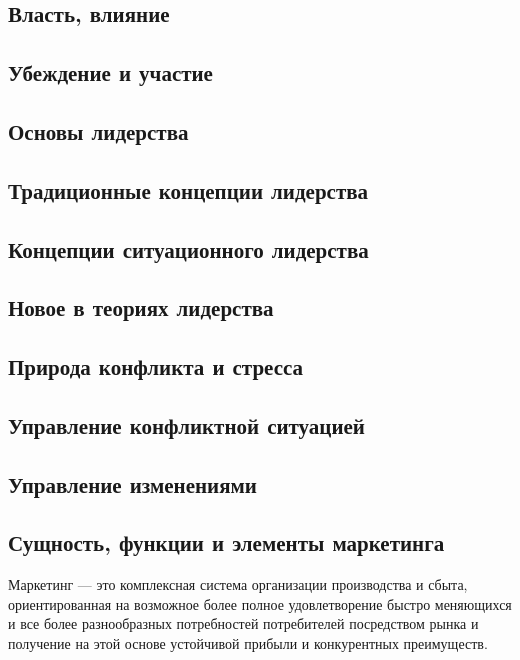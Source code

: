 \documentclass[a4paper,12pt,oneside,final]{extarticle}
\numberwithin{equation}{section}
\begin{document}
\subsection{Власть, влияние}

\subsection{Убеждение и участие}

\subsection{Основы лидерства}

\subsection{Традиционные концепции лидерства}

\subsection{Концепции ситуационного лидерства}

\subsection{Новое в теориях лидерства}

\subsection{Природа конфликта и стресса}

\subsection{Управление конфликтной ситуацией}

\subsection{Управление изменениями}

\subsection{Сущность, функции и элементы маркетинга}
Маркетинг --- это комплексная система организации производства и сбыта, ориентированная на возможное более полное удовлетворение быстро меняющихся и все более разнообразных потребностей потребителей посредством рынка и получение на этой основе устойчивой прибыли и конкурентных преимуществ.
\end{document}

